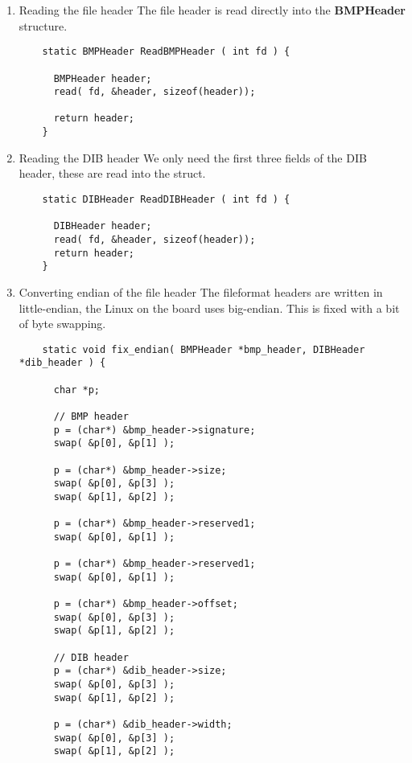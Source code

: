 \begin{enumerate}
\item Reading the file header \newline
  The file header is read directly into the {\bf BMPHeader} structure.
  \begin{lstlisting}
    static BMPHeader ReadBMPHeader ( int fd ) {

      BMPHeader header;
      read( fd, &header, sizeof(header));

      return header;
    }
  \end{lstlisting}

\item Reading the DIB header \newline
  We only need the first three fields of the DIB header, these are read
  into the struct.
  \begin{lstlisting}
    static DIBHeader ReadDIBHeader ( int fd ) {

      DIBHeader header;
      read( fd, &header, sizeof(header));
      return header;
    }
  \end{lstlisting}

\item Converting endian of the file header \newline
  The fileformat headers are written in little-endian, the Linux on the
  board uses big-endian. This is fixed with a bit of byte swapping.
  \begin{lstlisting}
    static void fix_endian( BMPHeader *bmp_header, DIBHeader *dib_header ) {

      char *p;

      // BMP header
      p = (char*) &bmp_header->signature;
      swap( &p[0], &p[1] );

      p = (char*) &bmp_header->size;
      swap( &p[0], &p[3] );
      swap( &p[1], &p[2] );

      p = (char*) &bmp_header->reserved1;
      swap( &p[0], &p[1] );

      p = (char*) &bmp_header->reserved1;
      swap( &p[0], &p[1] );

      p = (char*) &bmp_header->offset;
      swap( &p[0], &p[3] );
      swap( &p[1], &p[2] );

      // DIB header
      p = (char*) &dib_header->size;
      swap( &p[0], &p[3] );
      swap( &p[1], &p[2] );

      p = (char*) &dib_header->width;
      swap( &p[0], &p[3] );
      swap( &p[1], &p[2] );


\end{lstlisting}
\end{enumerate}
